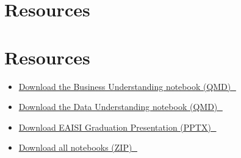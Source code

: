 \documentclass[
  american,
  10,
  a4paper,
]{book}
\providecommand{\tightlist}{%
  \setlength{\itemsep}{0pt}\setlength{\parskip}{0pt}}
\theoremstyle{definition}
\theoremstyle{remark}
\begin{document}
\chapter{Resources}\label{resources}

\chapter{Resources}\label{sec-19-resources}

\begin{itemize}
\tightlist
\item
  \href{../notebooks/01_business_understanding.qmd}{Download the
  Business Understanding notebook (QMD) 💾}
\item
  \href{../notebooks/02_data_understanding.qmd}{Download the Data
  Understanding notebook (QMD) 💾}
\item
  \href{../pptx/PAF+s03.pptx}{Download EAISI Graduation Presentation
  (PPTX) 💾}
\item
  \href{notebooks.zip}{Download all notebooks (ZIP) 💾}
\end{itemize}


\backmatter
\end{document}
